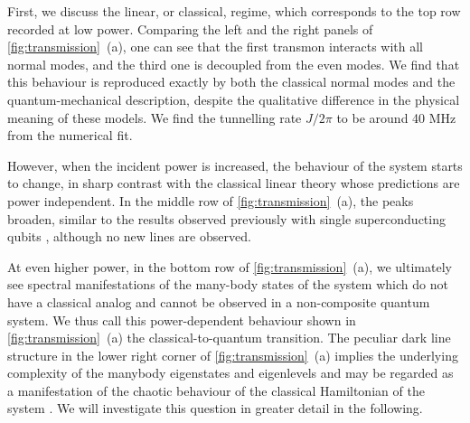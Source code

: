 \documentclass[%
 aps, pra,
 amsmath,amssymb,
 reprint,%
superscriptaddress
]{revtex4-2}
\begin{document}
First, we discuss the linear, or classical, regime, which corresponds to the top row recorded at low power. Comparing the left and the right panels of \autoref{fig:transmission}~(a), one can see that the first transmon interacts with all normal modes, and the third one is decoupled from the even modes. We find that this behaviour is reproduced exactly by both the classical normal modes and the quantum-mechanical description, despite the qualitative difference in the physical meaning of these models. We find the tunnelling rate $J/2\pi$ to be around 40 MHz from the numerical fit.

However, when the incident power is increased, the behaviour of the system starts to change, in sharp contrast with the classical linear theory whose predictions are power independent. In the middle row of \autoref{fig:transmission}~(a), the peaks broaden, similar to the results observed previously with single superconducting qubits  \cite{astafiev2010resonance}, although no new lines are observed. 

At even higher power, in the bottom row of \autoref{fig:transmission}~(a), we ultimately see spectral manifestations of the many-body states of the system which do not have a classical analog and cannot be observed in a non-composite quantum system. We thus call this power-dependent behaviour shown in \autoref{fig:transmission}~(a) the classical-to-quantum transition. The peculiar dark line structure in the lower right corner of \autoref{fig:transmission}~(a) implies the underlying complexity of the manybody eigenstates and eigenlevels and may be regarded as a manifestation of the chaotic behaviour of the classical Hamiltonian of the system \cite{zimmermann1986manifestation}. We will investigate this question in greater detail in the following.
\end{document}
